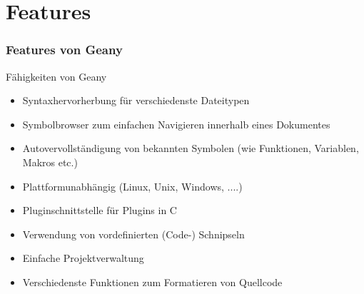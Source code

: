 \section{Features}
\begin{frame}[allowframebreak]
	\frametitle{Features von Geany}
	\begin{block}{Fähigkeiten von Geany}
		\begin{itemize}
			\item Syntaxhervorherbung für verschiedenste Dateitypen
			\item Symbolbrowser zum einfachen Navigieren innerhalb
			      eines Dokumentes
			\item Autovervollständigung von bekannten Symbolen (wie
				  Funktionen, Variablen, Makros etc.)
			\item Plattformunabhängig (Linux, Unix, Windows, ....)
			\item Pluginschnittstelle für Plugins in C
			\item Verwendung von vordefinierten (Code-) Schnipseln
			\item Einfache Projektverwaltung
			\item Verschiedenste Funktionen zum Formatieren von Quellcode
		\end{itemize}
	\end{block}
\end{frame}
